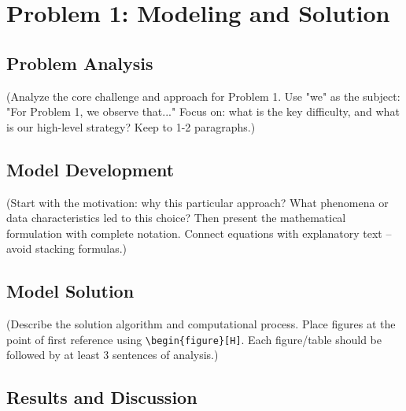 \section{Problem 1: Modeling and Solution}

\subsection{Problem Analysis}

(Analyze the core challenge and approach for Problem 1.
Use "we" as the subject: "For Problem 1, we observe that..."
Focus on: what is the key difficulty, and what is our high-level strategy?
Keep to 1-2 paragraphs.)

\subsection{Model Development}

(Start with the motivation: why this particular approach?
What phenomena or data characteristics led to this choice?
Then present the mathematical formulation with complete notation.
Connect equations with explanatory text -- avoid stacking formulas.)

\subsection{Model Solution}

(Describe the solution algorithm and computational process.
Place figures at the point of first reference using \verb|\begin{figure}[H]|.
Each figure/table should be followed by at least 3 sentences of analysis.)

%

\subsection{Results and Discussion}

